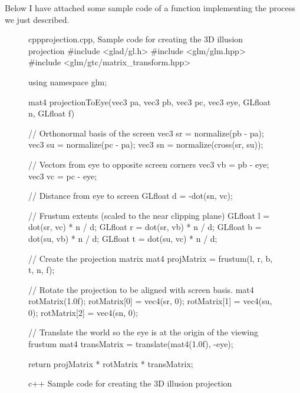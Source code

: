 Below I have attached some sample code of a function implementing the process we just described.
\begin{figure}[H]
    \begin{codeBox}{cpp}{projection.cpp, Sample code for creating the 3D illusion projection}
        #include <glad/gl.h>
        #include <glm/glm.hpp>
        #include <glm/gtc/matrix_transform.hpp>

        using namespace glm;

        mat4 projectionToEye(vec3 pa, vec3 pb, vec3 pc, vec3 eye, GLfloat n, GLfloat f)
        {
                // Orthonormal basis of the screen
                vec3 sr = normalize(pb - pa);
                vec3 su = normalize(pc - pa);
                vec3 sn = normalize(cross(sr, su));

                // Vectors from eye to opposite screen corners
                vec3 vb = pb - eye;
                vec3 vc = pc - eye;

                // Distance from eye to screen
                GLfloat d = -dot(sn, vc);

                // Frustum extents (scaled to the near clipping plane)
                GLfloat l = dot(sr, vc) * n / d;
                GLfloat r = dot(sr, vb) * n / d;
                GLfloat b = dot(su, vb) * n / d;
                GLfloat t = dot(su, vc) * n / d;

                // Create the projection matrix
                mat4 projMatrix = frustum(l, r, b, t, n, f);

                // Rotate the projection to be aligned with screen basis.
                mat4 rotMatrix(1.0f);
                rotMatrix[0] = vec4(sr, 0);
                rotMatrix[1] = vec4(su, 0);
                rotMatrix[2] = vec4(sn, 0);

                // Translate the world so the eye is at the origin of the viewing frustum
                mat4 transMatrix = translate(mat4(1.0f), -eye);

                return projMatrix * rotMatrix * transMatrix;
            }
    \end{codeBox}
    \caption{c++ Sample code for creating the 3D illusion projection}
    \label{fig:proj-code}
\end{figure}